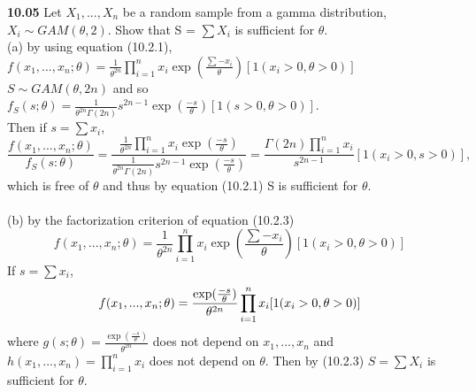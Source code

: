 
{ \bf 10.05 }
 Let $X_1, ..., X_n$ be a random sample from a gamma distribution, $X_i \sim GAM(\theta,2)$. Show that S = $\sum X_i $ is sufficient for $\theta$.\\
 (a) by using equation (10.2.1),\\
 $f(x_1,...,x_n;\theta)=\frac{1}{\theta^{2n}} \displaystyle \prod_{i=1}^n x_i \exp(\frac{ \sum -x_i}{\theta}) [1 (x_i > 0, \theta > 0)]$\\
 $S \sim GAM(\theta, 2n)$ and so $f_S(s;\theta)=\frac{1}{\theta^{2n} \Gamma (2n)} s^{2n-1}\exp(\frac{-s}{\theta})[1 (s>0, \theta >0)]$.\\
 Then if $s = \sum x_i$, 
 \begin{equation}
 	\frac{f(x_1,...,x_n;\theta)}{f_S(s:\theta)}=\frac{\frac{1}{\theta^{2n}} \displaystyle \prod_{i=1}^n x_i \exp(\frac{-s}{\theta})}{\frac{1}{\theta^{2n} \Gamma (2n)} s^{2n-1}\exp(\frac{-s}{\theta})} = \frac{\Gamma(2n) \displaystyle \prod_{i=1}^n x_i }{s^{2n-1}} [1(x_i >0, s>0)],
	\end{equation}
	 which is free of $\theta$ and thus by equation (10.2.1) S is sufficient for $\theta$.\\
	 \\
(b) by the factorization criterion of equation (10.2.3)\\
\begin{equation}
f(x_1,...,x_n;\theta)=\frac{1}{\theta^{2n}} \displaystyle \prod_{i=1}^n x_i \exp(\frac{ \sum -x_i}{\theta}) [1 (x_i > 0, \theta > 0)]
\end{equation}
If $s=\sum x_i$,
\begin{equation}
f(x_1,...,x_n;\theta)=\frac{\exp(\frac{-s}{\theta})}{\theta^{2n}} \displaystyle \prod_{i=1}^n x_i [1 (x_i > 0, \theta > 0)]\\
\end{equation}
 where $g(s;\theta) = \frac{\exp(\frac{-s}{\theta})}{\theta^{2n}}$ does not depend on $x_1,...,x_n$ and $h(x_1,...,x_n)=\displaystyle \prod_{i=1}^n x_i$ does not depend on $\theta$.  Then by (10.2.3) $S=\sum X_i$ is sufficient for $\theta$.
